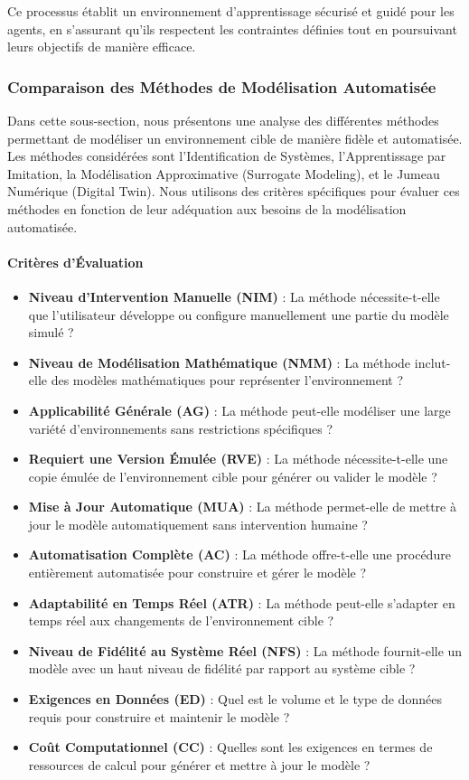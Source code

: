 \documentclass[sigconf,anonymous]{aamas}
\begin{document}
Ce processus établit un environnement d'apprentissage sécurisé et guidé pour les agents, en s'assurant qu'ils respectent les contraintes définies tout en poursuivant leurs objectifs de manière efficace.




\subsubsection{Comparaison des Méthodes de Modélisation Automatisée}

Dans cette sous-section, nous présentons une analyse des différentes méthodes permettant de modéliser un environnement cible de manière fidèle et automatisée. Les méthodes considérées sont l'Identification de Systèmes, l'Apprentissage par Imitation, la Modélisation Approximative (Surrogate Modeling), et le Jumeau Numérique (Digital Twin). Nous utilisons des critères spécifiques pour évaluer ces méthodes en fonction de leur adéquation aux besoins de la modélisation automatisée.

\paragraph{Critères d'Évaluation}

\begin{itemize}
    \item \textbf{Niveau d'Intervention Manuelle (NIM)} : La méthode nécessite-t-elle que l'utilisateur développe ou configure manuellement une partie du modèle simulé ?
    \item \textbf{Niveau de Modélisation Mathématique (NMM)} : La méthode inclut-elle des modèles mathématiques pour représenter l'environnement ?
    \item \textbf{Applicabilité Générale (AG)} : La méthode peut-elle modéliser une large variété d'environnements sans restrictions spécifiques ?
    \item \textbf{Requiert une Version Émulée (RVE)} : La méthode nécessite-t-elle une copie émulée de l'environnement cible pour générer ou valider le modèle ?
    \item \textbf{Mise à Jour Automatique (MUA)} : La méthode permet-elle de mettre à jour le modèle automatiquement sans intervention humaine ?
    \item \textbf{Automatisation Complète (AC)} : La méthode offre-t-elle une procédure entièrement automatisée pour construire et gérer le modèle ?
    \item \textbf{Adaptabilité en Temps Réel (ATR)} : La méthode peut-elle s'adapter en temps réel aux changements de l'environnement cible ?
    \item \textbf{Niveau de Fidélité au Système Réel (NFS)} : La méthode fournit-elle un modèle avec un haut niveau de fidélité par rapport au système cible ?
    \item \textbf{Exigences en Données (ED)} : Quel est le volume et le type de données requis pour construire et maintenir le modèle ?
    \item \textbf{Coût Computationnel (CC)} : Quelles sont les exigences en termes de ressources de calcul pour générer et mettre à jour le modèle ?
\end{itemize}
\end{document}
